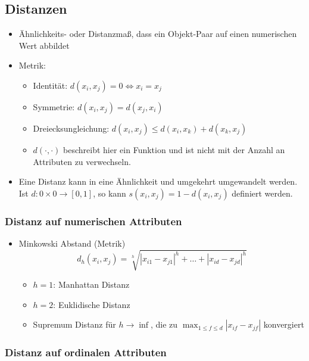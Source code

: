 \documentclass{scrartcl}
\begin{document}
\subsection{Distanzen}

\begin{itemize}
	\item Ähnlichkeits- oder Distanzmaß, dass ein Objekt-Paar auf einen 
	numerischen Wert abbildet
	\item Metrik:
	\begin{itemize}
		\item Identität: $ d(x_i,x_j) = 0 \iff x_i = x_j $
		\item Symmetrie: $ d(x_i,x_j) = d(x_j,x_i) $
		\item Dreiecksungleichung: $ d(x_i,x_j) \leq d(x_i,x_k) + d(x_k,x_j) $
		\item $ d(\cdot,\cdot) $ beschreibt hier ein Funktion und ist nicht mit 
		der Anzahl an Attributen zu verwechseln.
	\end{itemize}
	\item Eine Distanz kann in eine Ähnlichkeit und umgekehrt umgewandelt 
	werden. Ist $ d: 0 \times 0 \rightarrow [0,1] $, so kann $ s(x_i,x_j) = 1 - 
	d(x_i,x_j) $ definiert werden.
\end{itemize}

\subsubsection{Distanz auf numerischen Attributen}

\begin{itemize}
	\item Minkowski Abstand (Metrik)
	\[ d_h(x_i,x_j) = \sqrt[h]{|x_{i1} - x_{j1}|^h + \ldots + |x_{id} - 
	x_{jd}|^h} \]
	\begin{itemize}
		\item $ h=1 $: Manhattan Distanz
		\item $ h=2 $: Euklidische Distanz
		\item Supremum Distanz für $ h \rightarrow \inf $, die zu $ \max_{1 
		\leq f \leq d} |x_{if} - x_{jf}| $ konvergiert
	\end{itemize}
\end{itemize}

\subsubsection{Distanz auf ordinalen Attributen}
\end{document}
